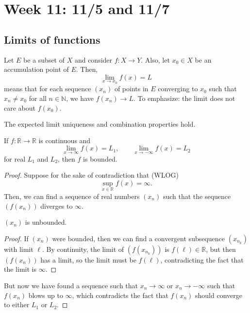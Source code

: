 \documentclass[10pt]{scrartcl}
\providecommand{\NN}{\mathbb N}
\providecommand{\RR}{\mathbb R}
\begin{document}
\pagebreak

\section{Week 11: 11/5 and 11/7}

\subsection{Limits of functions}

\begin{definition}\label{wk11:def:func-limit-seq}
	Let $E$ be a subset of $X$ and consider $f\colon X\to Y$.
	Also, let $x_0\in X$ be an accumulation point of $E$.
	Then,
	\[\lim_{x\to x_0} f(x) = L\]
	means that for each sequence $(x_n)$ of points in $E$ 
	converging to $x_0$ such that $x_n\ne x_0$ for all $n\in\NN$,
	we have $f(x_n)\to L$.
	To emphasize: the limit does not care about $f(x_0)$.
\end{definition}

The expected limit uniqueness and combination properties hold.

\begin{theorem}\label{wk11:thm:cont-and-real-lims-impl-bounded}
	If $f\colon\RR\to\RR$ is continuous and
	\[\lim_{x\to\infty} f(x) = L_1,\qquad
	\lim_{x\to-\infty} f(x) = L_2\]
	for real $L_1$ and $L_2$, then $f$ is bounded.
\end{theorem}

\begin{proof}
	Suppose for the sake of contradiction that (WLOG)
	\[\sup_{x\in\RR} f(x) = \infty.\]
	Then, we can find a sequence of real numbers $(x_n)$
	such that the sequence $(f(x_n))$ diverges to $\infty$.
	
	\begin{claim}
		$(x_n)$ is unbounded.
	\end{claim}
	\begin{proof}
		If $(x_n)$ were bounded, then we can find a convergent subsequence
		$(x_{n_k})$ with limit $\ell$. By continuity,
		the limit of $(f(x_{n_k}))$ is $f(\ell)\in\RR$,
		but then $(f(x_n))$ has a limit, so the limit must be
		$f(\ell)$, contradicting the fact that the limit is $\infty$.
	\end{proof}
	
	But now we have found a sequence such that $x_n\to\infty$
	or $x_n\to-\infty$ such that $f(x_n)$ blows up to $\infty$,
	which contradicts the fact that $f(x_n)$ should converge to
	either $L_1$ or $L_2$.
\end{proof}
\end{document}
